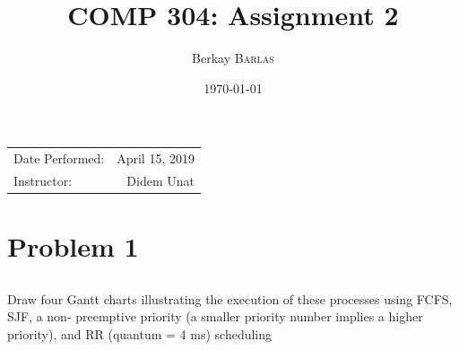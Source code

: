 \documentclass{article}
\title{COMP 304: Assignment 2} %
\author{Berkay \textsc{Barlas}} %
\date{\today} %
\begin{document}
\maketitle %

\begin{center}
\begin{tabular}{l r}
Date Performed: & April 15, 2019 \\ %
Instructor: & Didem Unat %
\end{tabular}
\end{center}




\section{Problem 1}

\subsection{}Draw four Gantt charts illustrating the execution of these processes using FCFS, SJF,
a non- preemptive priority (a smaller priority number implies a higher priority), and RR
(quantum = 4 ms) scheduling
\end{document}

